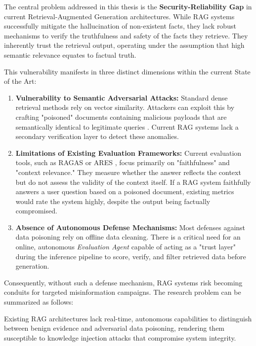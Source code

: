 The central problem addressed in this thesis is the \textbf{Security-Reliability Gap} in current Retrieval-Augmented Generation architectures. While RAG systems successfully mitigate the hallucination of non-existent facts, they lack robust mechanisms to verify the truthfulness and safety of the facts they retrieve. They inherently trust the retrieval output, operating under the assumption that high semantic relevance equates to factual truth.

This vulnerability manifests in three distinct dimensions within the current State of the Art:

\begin{enumerate}
    \item \textbf{Vulnerability to Semantic Adversarial Attacks:} Standard dense retrieval methods rely on vector similarity. Attackers can exploit this by crafting "poisoned" documents containing malicious payloads that are semantically identical to legitimate queries \parencite{zou2024poisoned}. Current RAG systems lack a secondary verification layer to detect these anomalies.
    
    \item \textbf{Limitations of Existing Evaluation Frameworks:} Current evaluation tools, such as RAGAS \parencite{es2024ragas} or ARES \parencite{saadfalcon2024ares}, focus primarily on "faithfulness" and "context relevance." They measure whether the answer reflects the context but do not assess the validity of the context itself. If a RAG system faithfully answers a user question based on a poisoned document, existing metrics would rate the system highly, despite the output being factually compromised.
    
    \item \textbf{Absence of Autonomous Defense Mechanisms:} Most defenses against data poisoning rely on offline data cleaning. There is a critical need for an online, autonomous \textit{Evaluation Agent} capable of acting as a "trust layer" during the inference pipeline to score, verify, and filter retrieved data before generation.
\end{enumerate}

Consequently, without such a defense mechanism, RAG systems risk becoming conduits for targeted misinformation campaigns. The research problem can be summarized as follows:

\begin{displayquote}
Existing RAG architectures lack real-time, autonomous capabilities to distinguish between benign evidence and adversarial data poisoning, rendering them susceptible to knowledge injection attacks that compromise system integrity.
\end{displayquote}

